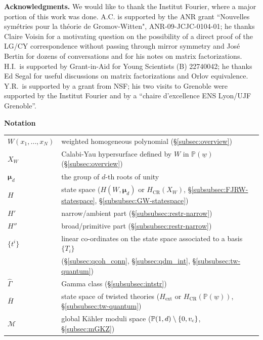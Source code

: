 \documentclass[11pt]{amsart}
\theoremstyle{definition} %
\theoremstyle{remark} %
\newcommand{\PP}{\mathbb P}
\newcommand{\tw}{{\rm tw}}
\def\GW{\operatorname{\text{GW}}}
\def\CR{\operatorname{\text{CR}}}
\newcommand{\bmu}{\boldsymbol{\mu}}
\newcommand{\cM}{\mathcal{M}}
\newcommand{\ext}{{\operatorname{ext}}}
\newcommand{\FJRW}{{\operatorname{FJRW}}}
\renewcommand{\GW}{{\operatorname{GW}}}
\renewcommand{\CR}{{\operatorname{CR}}}
\newcommand{\hGamma}{\widehat{\Gamma}}
\newcommand{\ov}{\overline}
\newcommand{\vc}{v_{\rm c}}
\newcommand{\uw}{\underline{w}}
\begin{document}
\vspace{10pt} 
\noindent 
{\bf Acknowledgments.} 
We would like to thank the Institut Fourier, 
where a major portion of this work was done. 
A.C. is supported by the ANR grant ``Nouvelles sym{\'e}tries 
pour la th{\'e}orie de Gromov-Witten", ANR-09-JCJC-0104-01;  
he thanks Claire Voisin for a motivating question on the 
possibility of a direct proof of the LG/CY correspondence 
without passing through mirror symmetry 
and Jos{\'e} Bertin for dozens of conversations 
and for his notes on matrix factorizations. 
H.I.\ is supported by Grant-in-Aid 
for Young Scientists (B) 22740042; 
he thanks Ed Segal for useful discussions 
on matrix factorizations and Orlov equivalence. 
Y.R.\ is supported by a grant from NSF; his two visits 
to Grenoble were supported by the Institut Fourier 
and by a ``chaire d'excellence ENS Lyon/UJF Grenoble''. 

\vspace{10pt} 
\noindent 
{\bf Notation}

\vspace{10pt} 
\begin{tabular}{ll}
$W(x_1,\dots,x_N)$ & weighted homogeneous polynomial 
(\S \ref{subsec:overview}) \\
$X_W$ & Calabi-Yau hypersurface defined by $W$ in $\PP(\uw)$ 
(\S \ref{subsec:overview}) \\
$\bmu_d$ & the group of $d$-th roots of unity \\
$H$  & state space 
($H(W,\bmu_d)$ or $H_{\CR}(X_W)$, 
\S \ref{subsubsec:FJRW-statespace}, \S \ref{subsubsec:GW-statespace}) 
\\
$H'$ & narrow/ambient part 
(\S \ref{subsubsec:restr-narrow}) \\ 
$H''$ & broad/primitive part 
(\S \ref{subsubsec:restr-narrow}) \\ 
$\{t^i\}$ & linear co-ordinates on the state space associated to 
a basis $\{T_i\}$ \\ 
& (\S \ref{subsec:qcoh_conn}, 
\S \ref{subsec:qdm_int}, \S \ref{subsubsec:tw-quantum}) \\  
$\hGamma$ & Gamma class 
(\S \ref{subsubsec:intstr})  \\ 
$\ov{H}$  & state space of twisted theories  
($H_\ext$ or $H_\CR(\PP(\uw))$, \S \ref{subsubsec:tw-quantum}) \\ 
$\cM$  & global 
K\"{a}hler moduli space ($\PP(1,d) \setminus \{0,\vc\}$, 
\S \ref{subsec:mGKZ}) 
\end{tabular} 
\end{document}
